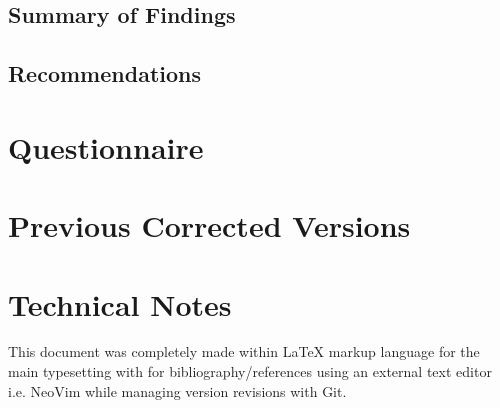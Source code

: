 \documentclass[12pt]{report}
\begin{document}
\section{Summary of Findings}
\section{Recommendations}

\lipsum

\printbibliography[heading=bibnumbered]


\appendix
\chapter{Questionnaire}
\lipsum
\chapter{Previous Corrected Versions}
\lipsum
\chapter{Technical Notes}

This document was completely made within {\LaTeX} markup language for the main
typesetting with  for bibliography/references using an external
text editor i.e. NeoVim while managing version revisions with Git.
\end{document}
